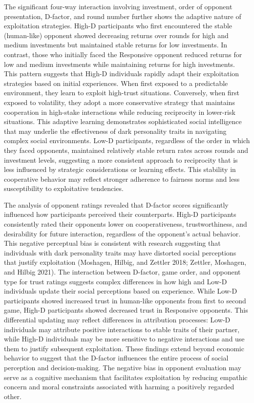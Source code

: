 \documentclass[
]{article}
\begin{document}
The significant four-way interaction involving investment, order of opponent presentation, D-factor, and round number further shows the adaptive nature of exploitation strategies. High-D participants who first encountered the stable (human-like) opponent showed decreasing returns over rounds for high and medium investments but maintained stable returns for low investments. In contrast, those who initially faced the Responsive opponent reduced returns for low and medium investments while maintaining returns for high investments.
This pattern suggests that High-D individuals rapidly adapt their exploitation strategies based on initial experiences. When first exposed to a predictable environment, they learn to exploit high-trust situations. Conversely, when first exposed to volatility, they adopt a more conservative strategy that maintains cooperation in high-stake interactions while reducing reciprocity in lower-risk situations. This adaptive learning demonstrates sophisticated social intelligence that may underlie the effectiveness of dark personality traits in navigating complex social environments.
Low-D participants, regardless of the order in which they faced opponents, maintained relatively stable return rates across rounds and investment levels, suggesting a more consistent approach to reciprocity that is less influenced by strategic considerations or learning effects. This stability in cooperative behavior may reflect stronger adherence to fairness norms and less susceptibility to exploitative tendencies.

The analysis of opponent ratings revealed that D-factor scores significantly influenced how participants perceived their counterparts. High-D participants consistently rated their opponents lower on cooperativeness, trustworthiness, and desirability for future interaction, regardless of the opponent's actual behavior. This negative perceptual bias is consistent with research suggesting that individuals with dark personality traits may have distorted social perceptions that justify exploitation (Moshagen, Hilbig, and Zettler 2018; Zettler, Moshagen, and Hilbig 2021).
The interaction between D-factor, game order, and opponent type for trust ratings suggests complex differences in how high and Low-D individuals update their social perceptions based on experience. While Low-D participants showed increased trust in human-like opponents from first to second game, High-D participants showed decreased trust in Responsive opponents. This differential updating may reflect differences in attribution processes: Low-D individuals may attribute positive interactions to stable traits of their partner, while High-D individuals may be more sensitive to negative interactions and use them to justify subsequent exploitation.
These findings extend beyond economic behavior to suggest that the D-factor influences the entire process of social perception and decision-making. The negative bias in opponent evaluation may serve as a cognitive mechanism that facilitates exploitation by reducing empathic concern and moral constraints associated with harming a positively regarded other.
\end{document}
